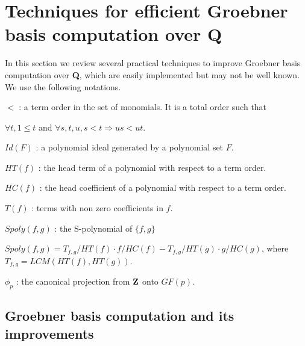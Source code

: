 \documentclass[runningheads]{cl2emult}
\begin{document}
\section{Techniques for efficient Groebner basis computation over {\bf Q}}
\label{gbtech}

In this section we review several practical techniques to improve
Groebner basis computation over {\bf Q}, which are easily
implemented but may not be well known.
We use the following notations.
\begin{description}
\item $<$ : a term order in the set of monomials. It is a total order such that

 $\forall t, 1 \le t$ and $\forall s, t, u, s<t \Rightarrow us<ut$.
\item $Id(F)$ : a polynomial ideal generated by a polynomial set $F$.
\item $HT(f)$ : the head term of a polynomial with respect to a term order.
\item $HC(f)$ : the head coefficient of a polynomial with respect to a term order.
\item $T(f)$ : terms with non zero coefficients in $f$.
\item $Spoly(f,g)$ : the S-polynomial of $\{f,g\}$ 

$Spoly(f,g) = T_{f,g}/HT(f)\cdot f/HC(f) -T_{f,g}/HT(g)\cdot g/HC(g)$, where
$T_{f,g} = LCM(HT(f),HT(g))$.
\item $\phi_p$ : the canonical projection from ${\bf Z}$ onto $GF(p)$.
\end{description}

\subsection{Groebner basis computation and its improvements}
\end{document}
